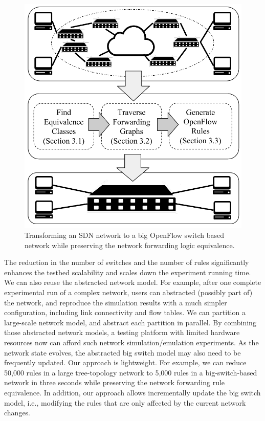 \begin{figure}[t]
\centering
\includegraphics[scale=.6]{figures/BigSimOverview.pdf}
\caption{Transforming an SDN network to a big OpenFlow switch based network while preserving the network forwarding logic equivalence.}
\label{Fig:BigSimOverview}
\end{figure}

The reduction in the number of switches and the number of rules significantly enhances the testbed scalability and scales down the experiment running time.  We can also reuse the abstracted network model. For example, after one complete experimental run of a complex network, users can abstracted (possibly part of) the network, and reproduce the simulation results with a much simpler configuration, including link connectivity and flow tables. We can partition a large-scale network model, and abstract each partition in parallel. By combining those abstracted network models, a testing platform with limited hardware resources now can afford such network simulation/emulation experiments. As the network state evolves, the abstracted big switch model may also need to be frequently updated. Our approach is lightweight. For example, we can reduce 50,000 rules in a large tree-topology network to 5,000 rules in a big-switch-based network in three seconds while preserving the network forwarding rule equivalence. In addition, our approach allows incrementally update the big switch model, i.e., modifying the rules that are only affected by the current network changes. 


